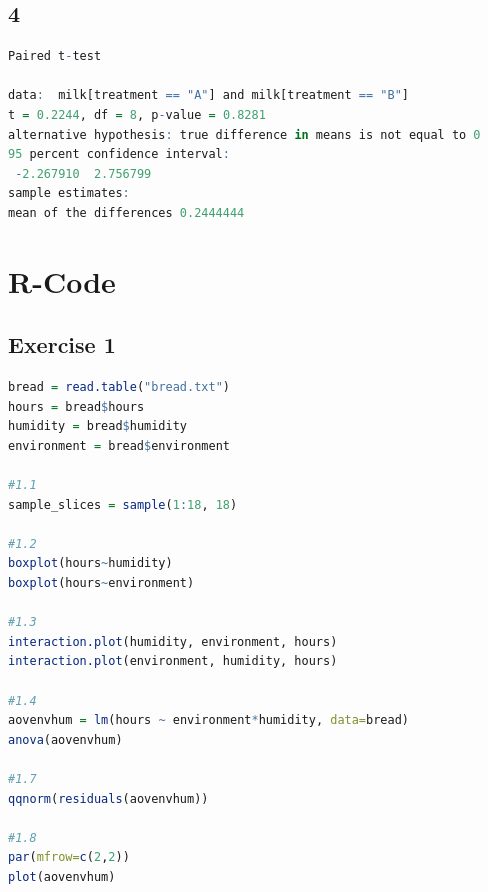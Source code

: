\documentclass{article}
\begin{document}
    \subsection*{4}
    \begin{lstlisting}[language=R]
    	Paired t-test

data:  milk[treatment == "A"] and milk[treatment == "B"]
t = 0.2244, df = 8, p-value = 0.8281
alternative hypothesis: true difference in means is not equal to 0
95 percent confidence interval:
 -2.267910  2.756799
sample estimates:
mean of the differences 0.2444444
    \end{lstlisting}

    
  \section{R-Code}
    \subsection{Exercise 1}\label{sec:RE1}
      \begin{lstlisting}[language=R]
bread = read.table("bread.txt")
hours = bread$hours
humidity = bread$humidity
environment = bread$environment

#1.1
sample_slices = sample(1:18, 18)

#1.2
boxplot(hours~humidity)
boxplot(hours~environment)

#1.3
interaction.plot(humidity, environment, hours)
interaction.plot(environment, humidity, hours)

#1.4
aovenvhum = lm(hours ~ environment*humidity, data=bread)
anova(aovenvhum)

#1.7
qqnorm(residuals(aovenvhum))

#1.8
par(mfrow=c(2,2))
plot(aovenvhum)

      \end{lstlisting}
\end{document}
